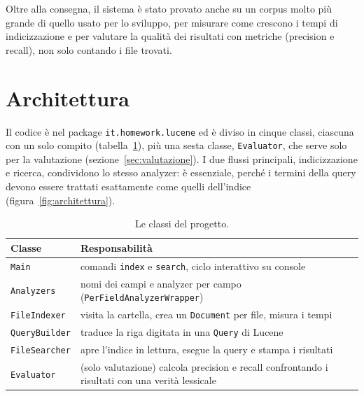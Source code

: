 \documentclass[11pt,a4paper]{article}
\newcommand{\code}[1]{\texttt{#1}}
\begin{document}
\noindent Oltre alla consegna, il sistema è stato provato anche su un corpus molto più
grande di quello usato per lo sviluppo, per misurare come crescono i tempi di
indicizzazione e per valutare la qualità dei risultati con metriche (precision e
recall), non solo contando i file trovati.

\section{Architettura}

Il codice è nel package \code{it.homework.lucene} ed è diviso in cinque classi,
ciascuna con un solo compito (tabella~\ref{tab:classi}), più una sesta classe,
\code{Evaluator}, che serve solo per la valutazione (sezione~\ref{sec:valutazione}). I due flussi principali,
indicizzazione e ricerca, condividono lo stesso analyzer: è essenziale, perché i
termini della query devono essere trattati esattamente come quelli dell'indice
(figura~\ref{fig:architettura}).

\begin{table}[H]
\centering
\begin{tabularx}{\linewidth}{@{}lX@{}}
\toprule
\textbf{Classe} & \textbf{Responsabilità} \\
\midrule
\code{Main} & comandi \code{index} e \code{search}, ciclo interattivo su console \\
\code{Analyzers} & nomi dei campi e analyzer per campo (\code{PerFieldAnalyzerWrapper}) \\
\code{FileIndexer} & visita la cartella, crea un \code{Document} per file, misura i tempi \\
\code{QueryBuilder} & traduce la riga digitata in una \code{Query} di Lucene \\
\code{FileSearcher} & apre l'indice in lettura, esegue la query e stampa i risultati \\
\code{Evaluator} & (solo valutazione) calcola precision e recall confrontando i risultati con una verità lessicale \\
\bottomrule
\end{tabularx}
\caption{Le classi del progetto.}
\label{tab:classi}
\end{table}
\end{document}
